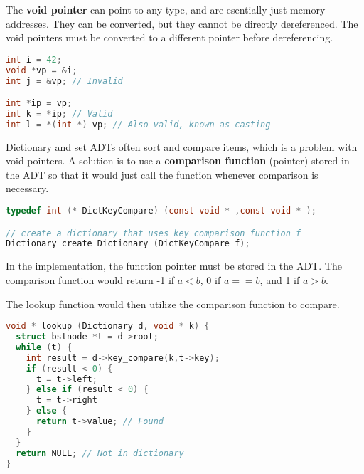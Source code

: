 \documentclass[english, 12pt]{article}
\begin{document}
\begin{defn}
The \textbf{void pointer} can point to any type, and are esentially just memory addresses. They can be converted, but they cannot be directly dereferenced. The void pointers must be converted to a different pointer before dereferencing.
\begin{lstlisting}[language=C]
int i = 42;
void *vp = &i;
int j = &vp; // Invalid

int *ip = vp;
int k = *ip; // Valid
int l = *(int *) vp; // Also valid, known as casting
\end{lstlisting}
\end{defn}

\begin{note}
Dictionary and set ADTs often sort and compare items, which is a problem with void pointers. A solution is to use a \textbf{comparison function} (pointer) stored in the ADT so that it would just call the function whenever comparison is necessary.
\end{note}
\begin{lstlisting}[language=C]
typedef int (* DictKeyCompare) (const void * ,const void * );

// create a dictionary that uses key comparison function f
Dictionary create_Dictionary (DictKeyCompare f);
\end{lstlisting}
\begin{qte}
In the implementation, the function pointer must be stored in the ADT. The comparison function would return -1 if $a < b$, 0 if $a == b$, and 1 if $a > b$.
\end{qte}

\begin{exmp}
The lookup function would then utilize the comparison function to compare.
\begin{lstlisting}[language=C]
void * lookup (Dictionary d, void * k) {
  struct bstnode *t = d->root;
  while (t) {
    int result = d->key_compare(k,t->key);
    if (result < 0) {
      t = t->left;
    } else if (result < 0) {
      t = t->right
    } else {
      return t->value; // Found
    }
  }
  return NULL; // Not in dictionary
}
\end{lstlisting}
\end{exmp}

\end{document}
